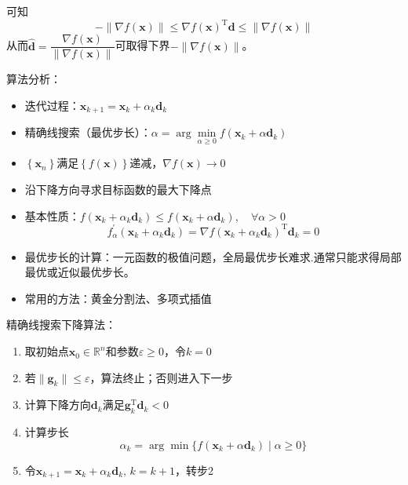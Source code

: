 可知
\[
    -\|\nabla f(\boldsymbol{x}) \| \leq \nabla f(\boldsymbol{x})^{\mathrm{T}} \boldsymbol{d} \leq \|\nabla f(\boldsymbol{x}) \|
\]
从而$\hat{\boldsymbol{d}} = \dfrac{\nabla f(\boldsymbol{x})}{\|\nabla f(\boldsymbol{x})\|}$可取得下界$-\|\nabla f(\boldsymbol{x}) \|$。
\begin{note}
    算法分析：
    \begin{itemize}
        \item 迭代过程：$\boldsymbol{x}_{k+1} = \boldsymbol{x}_k+\alpha_k \boldsymbol{d}_k$
        \item 精确线搜索（最优步长）：$\alpha = \arg\min\limits_{\alpha\geqslant 0}f(\boldsymbol{x}_k+\alpha\boldsymbol{d}_k)$
        \item $\left\{ \boldsymbol{x}_{n} \right\}$满足$\left\{ f(\boldsymbol{x}) \right\}$递减，$\nabla f(\boldsymbol{x})\to 0$
        \item 沿下降方向寻求目标函数的最大下降点
        \item 基本性质：$f(\boldsymbol{x}_{k}+\alpha_{k}\boldsymbol{d}_{k})\leqslant f(\boldsymbol{x}_{k}+\alpha \boldsymbol{d}_{k}),\quad\forall\alpha>0$
        \[
            f_{\alpha}^{\prime}(\boldsymbol{x}_{k}+\alpha_{k}\boldsymbol{d}_{k})=\nabla f(\boldsymbol{x}_{k}+\alpha_{k}\boldsymbol{d}_{k})^{\mathrm{T}}\boldsymbol{d}_{k}=0
        \]
    \end{itemize}
\end{note}

\begin{itemize}
    \item 最优步长的计算：一元函数的极值问题，全局最优步长难求.通常只能求得局部最优或近似最优步长。
    \item 常用的方法：黄金分割法、多项式插值
\end{itemize}

精确线搜索下降算法：
\begin{enumerate}
    \item 取初始点$\boldsymbol{x}_0\in\mathbb{R}^n$和参数$\varepsilon\geqslant 0$，令$k = 0$
    \item 若$\|\boldsymbol{g}_k\|\leqslant \varepsilon$，算法终止；否则进入下一步
    \item 计算下降方向$\boldsymbol{d}_k$满足$\boldsymbol{g}_k^{\mathrm{T}}\boldsymbol{d}_k<0$
    \item 计算步长
    \[
        \alpha_{k}=\arg\min\{f(\boldsymbol{x}_{k}+\alpha\boldsymbol{d}_{k})\mid\alpha\geqslant 0\}
    \]
    \item 令$\boldsymbol{x}_{k+1}=\boldsymbol{x}_{k}+\alpha_{k}\boldsymbol{d}_{k},\,k=k+1$，转步2
\end{enumerate}

